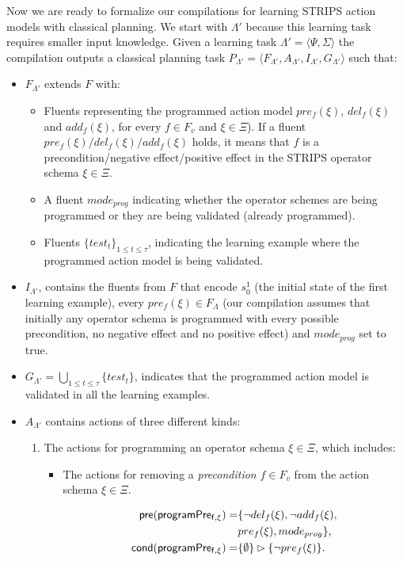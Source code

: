 \documentclass[letterpaper]{article} %
\newcommand{\tup}[1]{{\langle #1 \rangle}}
\newcommand{\pre}{\mathsf{pre}}     %
\newcommand{\cond}{\mathsf{cond}}   %
\begin{document}
Now we are ready to formalize our compilations for learning STRIPS action models with classical planning. We start with $\Lambda'$ because this learning task requires smaller input knowledge. Given a learning task $\Lambda'=\tup{\Psi,\Sigma}$ the compilation outputs a classical planning task $P_{\Lambda'}=\tup{F_{\Lambda'},A_{\Lambda'},I_{\Lambda'},G_{\Lambda'}}$ such that:
\begin{itemize}
\item $F_{\Lambda'}$ extends $F$ with:
\begin{itemize}
\item Fluents representing the programmed action model $pre_f(\xi)$, $del_f(\xi)$ and $add_f(\xi)$, for every $f\in F_v$ and $\xi \in \Xi$). If a fluent $pre_f(\xi)/del_f(\xi)/add_f(\xi)$ holds, it means that $f$ is a precondition/negative effect/positive effect in the STRIPS operator schema $\xi\in \Xi$.
\item A fluent $mode_{prog}$ indicating whether the operator schemes are being programmed or they are being validated (already programmed).
\item Fluents $\{test_t\}_{1\leq t\leq \tau}$, indicating the learning example where the programmed action model is being validated.
\end{itemize}
\item $I_{\Lambda'}$, contains the fluents from $F$ that encode $s_0^1$ (the initial state of the first learning example), every $pre_f(\xi)\in F_{\Lambda}$ (our compilation assumes that initially any operator schema is programmed with every possible precondition, no negative effect and no positive effect) and $mode_{prog}$ set to true.
\item $G_{\Lambda'}=\bigcup_{1\leq t\leq \tau}\{test_t\}$, indicates that the programmed action model is validated in all the learning examples.
\item $A_{\Lambda'}$ contains actions of three different kinds:
\begin{enumerate}
\item The actions for programming an operator schema $\xi\in\Xi$, which includes:
\begin{itemize}
\item The actions for removing a {\em precondition} $f\in F_v$ from the action schema $\xi\in\Xi$.

\begin{small}
\begin{align*}
\hspace*{7pt}\pre(\mathsf{programPre_{f,\xi}})=&\{\neg del_{f}(\xi),\neg add_{f}(\xi),\\
& pre_{f}(\xi), mode_{prog}\},\\
\cond(\mathsf{programPre_{f,\xi}})=&\{\emptyset\}\rhd\{\neg pre_{f}(\xi)\}.
\end{align*}
\end{small}


\end{itemize}
\end{enumerate}
\end{itemize}
\end{document}
